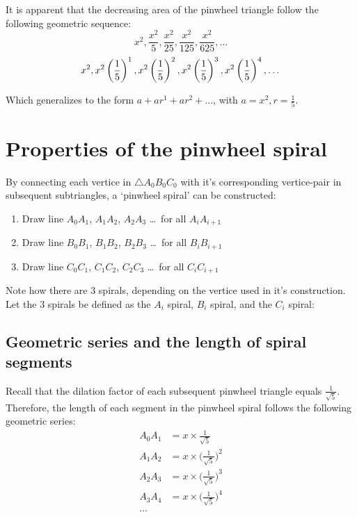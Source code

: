 \noindent
It is apparent that the decreasing area of the pinwheel triangle follow the following geometric sequence:
\begin{equation}
    x^2, \frac{x^2}{5}, \frac{x^2}{25}, \frac{x^2}{125}, \frac{x^2}{625}, \ldots
\end{equation}
\begin{equation}
    x^2, x^2\left(\frac{1}{5}\right)^1, x^2\left(\frac{1}{5}\right)^2, x^2\left(\frac{1}{5}\right)^3, x^2\left(\frac{1}{5}\right)^4, \ldots \\
\end{equation}

\noindent
Which generalizes to the form $a + ar^1 + ar^2 + \ldots$, with $a = x^2, r = \frac{1}{5}$.

\newpage
\section{Properties of the pinwheel spiral}
By connecting each vertice in $\triangle A_{0}B_{0}C_{0}$ with it's corresponding vertice-pair in subsequent subtriangles, a `pinwheel spiral' can be constructed:

\begin{enumerate}
    \item Draw line $A_{0}A_{1}$, $A_{1}A_{2}$, $A_{2}A_{3}$ \ldots\ for all $A_{i}A_{i + 1}$
    \item Draw line $B_{0}B_{1}$, $B_{1}B_{2}$, $B_{2}B_{3}$ \ldots\ for all $B_{i}B_{i + 1}$
    \item Draw line $C_{0}C_{1}$, $C_{1}C_{2}$, $C_{2}C_{3}$ \ldots\ for all $C_{i}C_{i + 1}$
\end{enumerate}



\noindent
Note how there are 3 spirals, depending on the vertice used in it's construction. Let the 3 spirals be defined as the $A_{i}$ spiral, $B_{i}$ spiral, and the $C_{i}$ spiral:







\newpage
\subsection{Geometric series and the length of spiral segments}
Recall that the dilation factor of each subsequent pinwheel triangle equals $\frac{1}{\sqrt{5}}$. Therefore, the length of each segment in the pinwheel spiral follows the following geometric series:
\begin{equation}
    \begin{aligned}
        A_{0}A_{1} &= x \times \frac{1}{\sqrt{5}} \\
        A_{1}A_{2} &= x \times \big(\frac{1}{\sqrt{5}}\big)^2 \\
        A_{2}A_{3} &= x \times \big(\frac{1}{\sqrt{5}}\big)^3 \\
        A_{3}A_{4} &= x \times \big(\frac{1}{\sqrt{5}}\big)^4 \\
        \ldots
    \end{aligned}
\end{equation}

